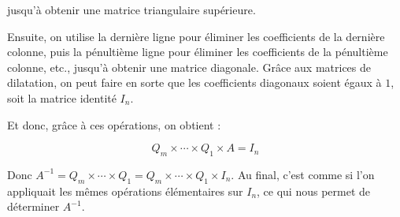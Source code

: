 \documentclass[12pt, a4paper]{report}
\begin{document}
jusqu'à obtenir une matrice triangulaire supérieure.

Ensuite, on utilise la dernière ligne pour éliminer les coefficients de la dernière colonne, puis la pénultième ligne pour éliminer les coefficients de la pénultième colonne, etc., jusqu'à obtenir une matrice diagonale. Grâce aux matrices de dilatation, on peut faire en sorte que les coefficients diagonaux soient égaux à $1$, soit la matrice identité $I_n$.

Et donc, grâce à ces opérations, on obtient :

$$Q_m \times \cdots \times Q_1 \times A = I_n$$

Donc $A^{-1} = Q_m \times \cdots \times Q_1 = Q_m \times \cdots \times Q_1 \times I_n$. Au final, c'est comme si l'on appliquait les mêmes opérations élémentaires sur $I_n$, ce qui nous permet de déterminer $A^{-1}$.
\end{document}
